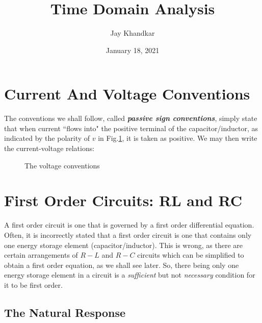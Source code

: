 \documentclass[11pt]{article}
\title{\textbf{Time Domain Analysis}}
\author{Jay Khandkar}
\date{January 18, 2021}
\numberwithin{equation}{section}
\newcommand*\widefbox[1]{\fbox{\hspace{2em}#1\hspace{2em}}}
\begin{document}

\newpage
\tableofcontents
\newpage
\begin{flushleft}
\color{blue}
\section{Current And Voltage Conventions}
\color{black}

The conventions we shall follow, called \textit{\textbf{passive sign conventions}}, simply state that when 
current ``flows into" the positive terminal of the capacitor/inductor, as indicated by the polarity of $v$
in Fig.\ref{fig:conventions}, it is taken as positive. We may then write the current-voltage relations:


\begin{figure}[H]
\centering
{}
\caption{The voltage conventions}
\label{fig:conventions}	
\end{figure}

\color{blue}
\section{First Order Circuits: RL and RC}
\color{black}
A first order circuit is one that is governed by a first order differential equation. Often, it is
incorrectly stated that a first order circuit is one that contains only one energy storage element
(capacitor/inductor). This is wrong, as there are certain arrangements of $R-L$ and $R-C$ circuits
which can be simplified to obtain a first order equation, as we shall see later. So, there being only
one energy storage element in a circuit is a \textit{sufficient} but not \textit{necessary} condition for
it to be first order.

\color{blue}
\subsection{The Natural Response}

\end{flushleft}
\end{document}
